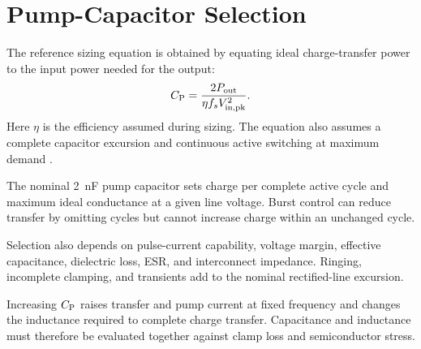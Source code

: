 \section{Pump-Capacitor Selection}
\label{sec:analysis-cp}

The reference sizing equation is obtained by equating ideal charge-transfer power to the input power needed for the output:
\begin{equation}
C_{\mathrm{P}}=\frac{2P_{\mathrm{out}}}{\eta f_sV_{\mathrm{in,pk}}^2}.
\label{eq:cp-sizing}
\end{equation}
Here \(\eta\) is the efficiency assumed during sizing. The equation also assumes a complete capacitor excursion and continuous active switching at maximum demand \cite{ammar2021led}.

The nominal \SI{2}{\nano\farad} pump capacitor sets charge per complete active cycle and maximum ideal conductance at a given line voltage. Burst control can reduce transfer by omitting cycles but cannot increase charge within an unchanged cycle.

Selection also depends on pulse-current capability, voltage margin, effective capacitance, dielectric loss, ESR, and interconnect impedance. Ringing, incomplete clamping, and transients add to the nominal rectified-line excursion.

Increasing \(C_{\mathrm{P}}\) raises transfer and pump current at fixed frequency and changes the inductance required to complete charge transfer. Capacitance and inductance must therefore be evaluated together against clamp loss and semiconductor stress.
